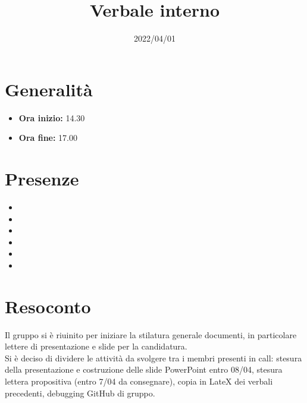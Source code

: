 \documentclass{classes/base}
\title{Verbale interno}
\date{2022/04/01}
\author{\marcob}
\renewcommand{\maketitle}{
    
}
\begin{document}
    \maketitle

    \section*{Generalità}
    \begin{itemize}
        \item \textbf{Ora inizio:} 14.30
        \item \textbf{Ora fine:} 17.00
    \end{itemize}

    \section*{Presenze}
    \begin{itemize}
     	\item \angela
        \item \marcob
        \item \ruth
        \item \matteo
        \item \marcov
        \item \giulio
    \end{itemize}
    
    \section*{Resoconto}
    Il gruppo si è riuinito per iniziare la stilatura generale documenti, in particolare lettere di presentazione e slide per la candidatura.\\
    Si è deciso di dividere le attività da svolgere tra i membri presenti in call: stesura della presentazione e costruzione delle slide PowerPoint entro 08/04, stesura lettera propositiva (entro 7/04 da consegnare), copia in LateX dei verbali precedenti, debugging GitHub di gruppo.
\end{document}
